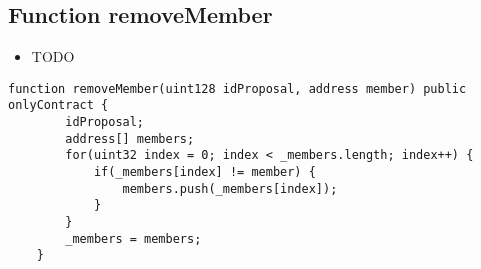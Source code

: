 \subsection{Function removeMember}

\begin{itemize}
\item TODO
\end{itemize}

\begin{lstlisting}[firstnumber=30]
    function removeMember(uint128 idProposal, address member) public onlyContract {
        idProposal;
        address[] members;
        for(uint32 index = 0; index < _members.length; index++) {
            if(_members[index] != member) {
                members.push(_members[index]);
            }
        }
        _members = members;
    }
\end{lstlisting}
